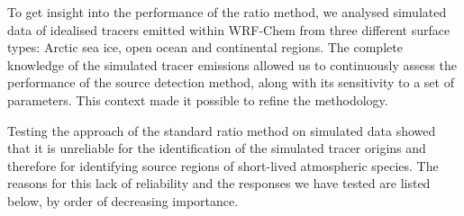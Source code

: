     To get insight into the performance of the ratio method, we analysed simulated data of idealised tracers emitted within WRF-Chem from three different surface types: Arctic sea ice, open ocean and continental regions.
    The complete knowledge of the simulated tracer emissions allowed us to continuously assess the performance of the source detection method, along with its sensitivity to a set of parameters.
    This context made it possible to refine the methodology.

    Testing the approach of the standard ratio method on simulated data showed that it is unreliable for the identification of the simulated tracer origins and therefore for identifying source regions of short-lived atmospheric species.
    The reasons for this lack of reliability and the responses we have tested are listed below, by order of decreasing importance.
